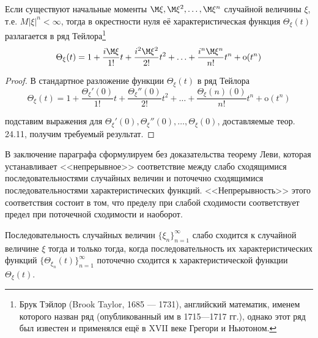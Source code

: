 \begin{lemma}
Если существуют начальные моменты $\M \xi, \M \xi^2 , \ldots , \M \xi^n$ случайной величины $\xi$, т.е. $M |\xi|^n < \infty$, тогда в окрестности нуля её
характеристическая функция $\Theta_{\xi} (t)$ разлагается в ряд Тейлора\footnote{
Брук Тэйлор (Brook Taylor, 1685 — 1731), английский математик, именем которого назван ряд (опубликованный им в 1715—1717 гг.), однако этот ряд был известен и применялся ещё в XVII веке Грегори и Ньютоном.
}
$$\Theta_{\xi} (t) = 1 + \frac{i\M \xi}{1!}t + \frac{i^2 \M \xi^2}{2!}t^2 + \ldots + \frac{i^n \M \xi^n}{n!}t^n + \text{o}(t^n)$$
\end{lemma}

\begin{proof}
В стандартное разложение функции $\Theta_{\xi} (t)$ в ряд Тейлора
$$\Theta_{\xi} (t) = 1 + \frac{\Theta_{\xi}'(0)}{1!}t + \frac{\Theta_{\xi}''(0)}{2!}t^2 + \ldots + \frac{\Theta_{\xi}(n)(0)}{n!}t^n + \text{o}(t^n)$$ 

подставим выражения для $\Theta_{\xi}' (0), \Theta_{\xi}'' (0), \ldots , \Theta_{\xi} (0)$, доставляемые теор.
24.11, получим требуемый результат.
\end{proof}

В заключение параграфа сформулируем без доказательства теорему Леви, которая устанавливает <<непрерывное>> соответствие между слабо сходящимися последовательностями случайных величин и поточечно сходящимися последовательностями характеристических функций. <<Непрерывность>> этого соответствия состоит в том, что пределу при слабой сходимости соответствует предел при поточечной сходимости и наоборот.

\begin{theorem}
Последовательность случайных величин $\{\xi_n \}_{n=1}^{\infty}$ слабо сходится к случайной величине $\xi$
тогда и только тогда, когда последовательность их характеристических функций $\{\Theta_{\xi_n} (t)\}_{n=1}^{\infty}$ поточечно сходится к характеристической функции $\Theta_{\xi} (t)$.
\end{theorem}